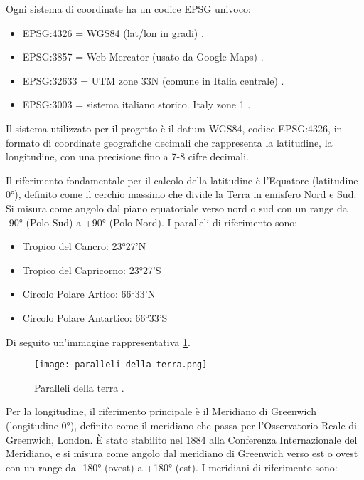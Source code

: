 Ogni sistema di coordinate ha un codice EPSG univoco:

\begin{itemize}
\item EPSG:4326 = WGS84 (lat/lon in gradi) \cite{epsg4326}.
\item EPSG:3857 = Web Mercator (usato da Google Maps) \cite{epsg3857}.
\item EPSG:32633 = UTM zone 33N (comune in Italia centrale) \cite{epsg32633}.
\item EPSG:3003 = sistema italiano storico. Italy zone 1 \cite{epsg3003}.
\end{itemize}

Il sistema utilizzato per il progetto è il datum WGS84, codice EPSG:4326, in formato di coordinate geografiche decimali che rappresenta la latitudine, la longitudine, con una precisione fino a 7-8 cifre decimali.

Il riferimento fondamentale per il calcolo della latitudine è l'Equatore (latitudine 0°), definito come il cerchio massimo che divide la Terra in emisfero Nord e Sud. Si misura come angolo dal piano equatoriale verso nord o sud con un range da -90° (Polo Sud) a +90° (Polo Nord). I paralleli di riferimento sono:

\begin{itemize}
\item Tropico del Cancro: 23°27'N
\item Tropico del Capricorno: 23°27'S
\item Circolo Polare Artico: 66°33'N
\item Circolo Polare Antartico: 66°33'S
\end{itemize}

Di seguito un'immagine rappresentativa \ref{fig:paralleli-della-terra}.

\begin{figure}[H]
  \centering
  \texttt{[image: paralleli-della-terra.png]}
  \caption{Paralleli della terra \cite{chimica-online-equatore}.}
  \label{fig:paralleli-della-terra}
\end{figure}

Per la longitudine, il riferimento principale è il Meridiano di Greenwich (longitudine 0°), definito come il meridiano che passa per l'Osservatorio Reale di Greenwich, London. È stato stabilito nel 1884 alla Conferenza Internazionale del Meridiano, e si misura come angolo dal meridiano di Greenwich verso est o ovest con un range da -180° (ovest) a +180° (est). I meridiani di riferimento sono:

